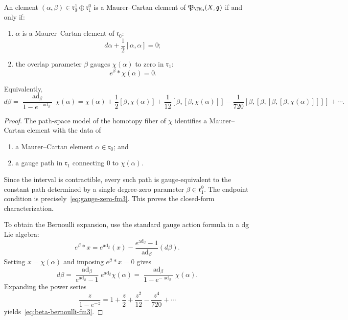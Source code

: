 \begin{theorem}
\label{thm:fm3-mc-dictionary}
An element $(\alpha,\beta)\in \mathfrak r_0^1\oplus \mathfrak r_1^0$ is a
Maurer--Cartan element of $\mathfrak P_{\FM_3}(X,\mathfrak g)$ if and only if:
\begin{enumerate}[label=\textup{(\alph*)}]
\item $\alpha$ is a Maurer--Cartan element of $\mathfrak r_0$:
  \begin{equation}
  \label{eq:alpha-mc-fm3}
  d\alpha + \frac12[\alpha,\alpha] = 0;
  \end{equation}
\item the overlap parameter $\beta$ gauges $\chi(\alpha)$ to zero in
  $\mathfrak r_1$:
  \begin{equation}
  \label{eq:gauge-zero-fm3}
  e^{\beta} * \chi(\alpha) = 0.
  \end{equation}
\end{enumerate}
Equivalently,
\begin{equation}
\label{eq:beta-bernoulli-fm3}
 d\beta
 =
 \frac{\operatorname{ad}_{\beta}}{1-e^{-\operatorname{ad}_{\beta}}}\,\chi(\alpha)
 =
 \chi(\alpha)
 + \frac12[\beta,\chi(\alpha)]
 + \frac1{12}[\beta,[\beta,\chi(\alpha)]]
 - \frac1{720}[\beta,[\beta,[\beta,[\beta,\chi(\alpha)]]]]
 + \cdots.
\end{equation}
\end{theorem}

\begin{proof}
The path-space model of the homotopy fiber of $\chi$ identifies a Maurer--Cartan
element with the data of
\begin{enumerate}[label=\textup{(\roman*)}]
\item a Maurer--Cartan element $\alpha\in \mathfrak r_0$; and
\item a gauge path in $\mathfrak r_1$ connecting $0$ to $\chi(\alpha)$.
\end{enumerate}
Since the interval is contractible, every such path is gauge-equivalent to the
constant path determined by a single degree-zero parameter $\beta\in \mathfrak r_1^0$.
The endpoint condition is precisely~\eqref{eq:gauge-zero-fm3}.  This proves the
closed-form characterization.

To obtain the Bernoulli expansion, use the standard gauge action formula in a dg
Lie algebra:
\[
 e^{\beta} * x
 =
 e^{\operatorname{ad}_{\beta}}(x)
 - \frac{e^{\operatorname{ad}_{\beta}}-1}{\operatorname{ad}_{\beta}}(d\beta).
\]
Setting $x=\chi(\alpha)$ and imposing $e^{\beta}*x=0$ gives
\[
 d\beta
 =
 \frac{\operatorname{ad}_{\beta}}{e^{\operatorname{ad}_{\beta}}-1}
 e^{\operatorname{ad}_{\beta}}\chi(\alpha)
 =
 \frac{\operatorname{ad}_{\beta}}{1-e^{-\operatorname{ad}_{\beta}}}\chi(\alpha).
\]
Expanding the power series
\[
\frac{z}{1-e^{-z}} = 1 + \frac{z}{2} + \frac{z^2}{12} - \frac{z^4}{720} + \cdots
\]
yields~\eqref{eq:beta-bernoulli-fm3}.
\end{proof}

